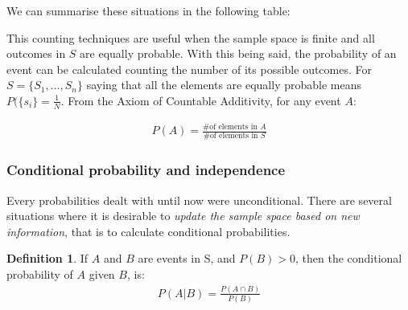 \documentclass[
  oneside,
  11pt, a4paper,
  footinclude=true,
  headinclude=true,
  cleardoublepage=empty
]{scrbook}
\theoremstyle{definition}
\newtheorem{definition}{Definition}[section]
\theoremstyle{definition}
\begin{document}
        We can summarise these situations in the following table:
        \begin{table}[h]
            \centering
            \caption{Number of possible arrangements of size $r$ from $n$ objects}
            \label{tab:my-table}
        \end{table}
        
        This counting techniques are useful when the sample space is finite and all outcomes in $S$ are equally probable. With this being said, the probability of an event can be calculated counting the number of its possible outcomes. For $S = \{S_1, ..., S_n\}$ saying that all the elements are equally probable means $P(\{s_i\} = \frac{1}{N}$. From the Axiom of Countable Additivity, for any event $A$:
        
        \begin{align*}
            P(A) = \frac{\text{\# of elements in $A$}}{\text{\# of elements in $S$}}
        \end{align*}{}
        
        \subsubsection{Conditional probability and independence}
        
        Every probabilities dealt with until now were unconditional. There are several situations where it is desirable to \emph{update the sample space based on new information}, that is to calculate conditional probabilities.
        
        \begin{definition}{If $A$ and $B$ are events in S, and $P(B) > 0$, then the conditional probability of $A$ given $B$, is:}\label{d-2-1-6}
            \begin{align*}
                P(A|B) = \frac{P(A \cap B)}{P(B)}
            \end{align*}{}
        \end{definition}{}
        
\end{document}
